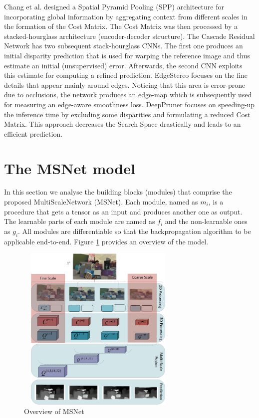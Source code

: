 \documentclass[runningheads]{llncs}
\begin{document}
Chang et al. \cite{Chang2018PyramidNetwork} designed a Spatial Pyramid Pooling (SPP) architecture for incorporating global information by aggregating context from different scales in the formation of the Cost Matrix. The Cost Matrix was then processed by a stacked-hourglass architecture (encoder-decoder structure). The Cascade Residual Network \cite{Pang2018CascadeMatching} has two subsequent stack-hourglass CNNs. The first one produces an initial disparity prediction that is used for warping the reference image and thus estimate an initial (unsupervised) error. Afterwards, the second CNN exploits this estimate for computing a refined prediction. EdgeStereo \cite{SongEdgeStereoResidual} focuses on the fine details that appear mainly around edges. Noticing that this area is error-prone due to occlusions, the network produces an edge-map which is subsequently used for measuring an edge-aware smoothness loss. DeepPruner \cite{du2019amnet} focuses on speeding-up the inference time by excluding some disparities and formulating a reduced Cost Matrix. This approach decreases the Search Space drastically and leads to an efficient prediction.




\section{The MSNet model}

In this section we analyse the building blocks (modules) that comprise the proposed MultiScaleNetwork (MSNet). Each module, named as $m_i$, is a procedure that gets a tensor as an input and produces another one as output. The learnable parts of each module are named as $f_i$ and the non-learnable ones as $g_i$. All modules are differentiable so that the backpropagation algorithm to be applicable end-to-end. Figure \ref{fig:cnn_architecture} provides an overview of the model.

\begin{figure}[!htbp]
    \centering
    \includegraphics[width=0.7\textwidth, height=8cm]{figures/stereo_architecture.png}
    \caption{Overview of MSNet}
    \label{fig:cnn_architecture}
\end{figure}
\end{document}

